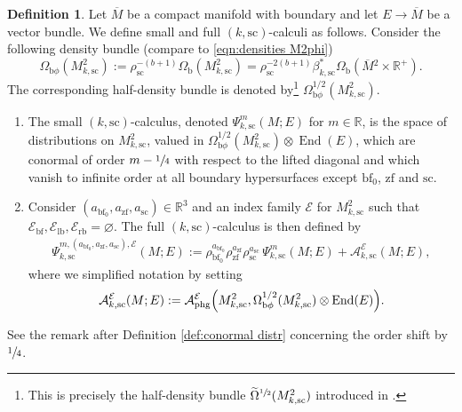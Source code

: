 \documentclass[11pt]{article}
\numberwithin{equation}{section}
\newcommand{\bphi}{{\bb\phi}}
\theoremstyle{plain}
\theoremstyle{definition}
\newtheorem{defn}[Th]{Definition}
\newcommand{\R}{{\mathbb{R}}}
\newcommand\calA{{\mathcal A}}
\newcommand\calE{{\mathcal E}}
\newcommand {\phg}{{\mathrm{phg}}}
\newcommand{\lf}{{\mathrm{lb}}}
\newcommand{\rf}{{\mathrm{rb}}}
\newcommand{\bb}{{\mathrm{b}}}
\newcommand{\bbf}{{\mathrm{bf}}}
\newcommand{\bbfz}{{\bbf_0}}
\newcommand{\bfz}{{\bbf_0}}
\newcommand{\ssc}{{\mathrm{sc}}}
\newcommand{\zf}{{\mathrm{zf}}}
\DeclareMathOperator{\End}{End}
\newcommand{\Mbar}{{\overline{M}}}\let\M\Mbar
\begin{document}
\begin{defn}\label{def:ksc space}
Let $\Mbar$ be a compact manifold with boundary and let $E\to\Mbar$ be a vector bundle.
We define small and full $(k,\ssc)$-calculi as follows. Consider the
following density bundle (compare to \eqref{eqn:densities M2phi})
\begin{equation}
\Omega_{\bphi}(M^{2}_{k, \ssc}) := \rho_{\ssc}^{-(b+1)}
\Omega_\bb(M^{2}_{k, \ssc}) = \rho_{\ssc}^{-2(b+1)}
\beta_{k, \ssc}^* \Omega_\bb(\Mbar{}^2 \times \R^+).
\end{equation}
The corresponding half-density bundle is denoted by\footnote{This is precisely the
half-density bundle $\widetilde{\Omega}^{\sfrac{1}{2}}(M^{2}_{k, \ssc})$ introduced in
\cite[\S 2.2.2]{guillarmou2008resolvent}.} $\Omega^{1/2}_{\bphi}(M^{2}_{k, \ssc})$.
\begin{enumerate}
\item
The small $(k,\ssc)$-calculus, denoted $\Psi_{k,\ssc}^{m}(M;E)$ for $m\in\R$, is the space of distributions on $M^2_{k,\ssc}$, valued in $\Omega^{1/2}_{\bphi}(M^{2}_{k, \ssc}) \otimes \End(E)$,
which are conormal of order $m-\sfrac14$ with
respect to the lifted diagonal and which vanish to infinite order at all boundary hypersurfaces except $\bbfz$, $\zf$ and $\ssc$.

\item
Consider $(a_{\bfz},a_{\zf},a_{\ssc}) \in \mathbb{R}^{3}$ and an index family $\mathcal{E}$ for $M^{2}_{k, \ssc}$ such that
$\mathcal{E}_{\bbf},\mathcal{E}_{\lf}, \mathcal{E}_{\rf} = \varnothing$.
The full $(k,\ssc)$-calculus is then defined by
\begin{equation}
\label{GH-calculus}
\begin{split}
\Psi_{k,\ssc}^{m,(a_{\bfz},a_{\zf},a_{\ssc}),\calE}(M;E) :=
\rho_{\bbfz}^{a_\bbfz}\rho_\zf^{a_\zf}\rho_\ssc^{a_\ssc}\,\Psi_{k,\ssc}^{m}(M;E) + \calA_{k, \ssc}^\calE(M;E),
\end{split}
\end{equation}
where we simplified notation by setting
\begin{equation}
\begin{split}
\calA_{k, \ssc}^\calE(M;E):= \calA_{\phg}^\calE \Bigl(M^{2}_{k, \ssc},
\Omega^{1/2}_{\bphi} (M^{2}_{k, \ssc})
\otimes \End(E)\Bigr).
\end{split}
\end{equation}
\end{enumerate}
\end{defn}

See the remark after Definition \ref{def:conormal distr} concerning the order shift by $\sfrac14$.
\end{document}
